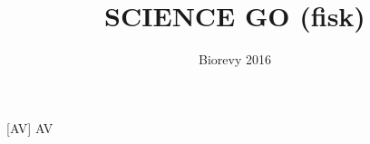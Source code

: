 \documentclass[a4paper,11pt]{article}
\title{SCIENCE GO (fisk)}
\author{Biorevy 2016}
\begin{document}
\maketitle

\begin{roles}
    [AV] AV
\end{roles}

\begin{sketch}


\end{sketch}
\end{document}
